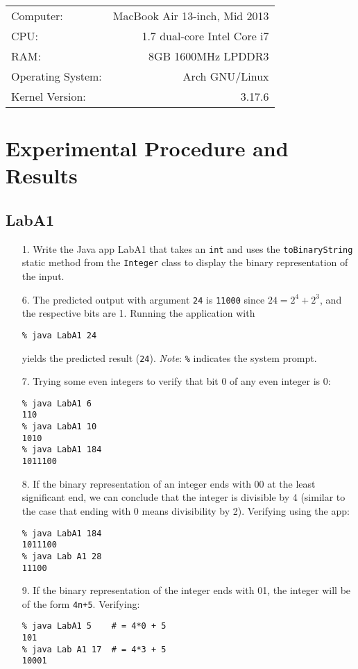 \documentclass{article}
\begin{document}
\begin{center}
\begin{tabular}{l r}
Computer: & MacBook Air 13-inch, Mid 2013 \\
CPU: & 1.7 dual-core Intel Core i7 \\
RAM: & 8GB 1600MHz LPDDR3 \\
Operating System: & Arch GNU/Linux \\
Kernel Version: & 3.17.6
\end{tabular}
\end{center}


\section{Experimental Procedure and Results}

\subsection{LabA1}
\begin{enumerate}
\item[1. ] Write the Java app LabA1 that takes an \verb$int$ and uses the \verb$toBinaryString$ static method from the \verb$Integer$ class to display the binary representation of the input.

\item[6. ] The predicted output with argument \verb$24$ is \verb$11000$ since $24 = 2^4 + 2^3$, and the respective bits are 1.
Running the application with
\begin{verbatim}
% java LabA1 24
\end{verbatim}
yields the predicted result (\verb$24$). \newline
{\it Note}: \verb$%$ indicates the system prompt.

\item[7. ] Trying some even integers to verify that bit 0 of any even integer is 0:
\begin{verbatim}
% java LabA1 6
110
% java LabA1 10
1010
% java LabA1 184
1011100
\end{verbatim}

\item[8. ] If the binary representation of an integer ends with 00 at the least significant end, we can conclude that the integer is divisible by 4 (similar to the case that ending with 0 means divisibility by 2). Verifying using the app:
\begin{verbatim}
% java LabA1 184
1011100
% java Lab A1 28
11100
\end{verbatim}

\item[9. ] If the binary representation of the integer ends with 01, the integer will be of the form \verb$4n+5$. Verifying:
\begin{verbatim}
% java LabA1 5    # = 4*0 + 5
101
% java Lab A1 17  # = 4*3 + 5
10001
\end{verbatim}

\end{enumerate}
\end{document}
